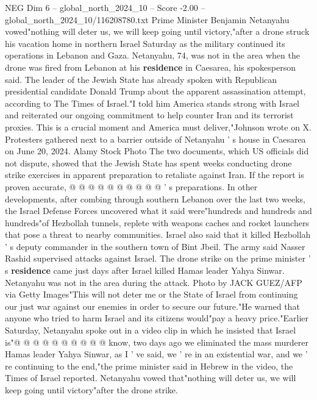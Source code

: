 \begin{textsample}{NEG Dim 6 – global\_north\_2024\_10 – Score -2.00 – global\_north\_2024\_10/116208780.txt}  \label{ex:f6_neg_077}
Prime Minister Benjamin Netanyahu vowed"nothing will deter us, we will keep going until victory,"after a drone struck his vacation home in northern Israel Saturday as the military continued its operations in Lebanon and Gaza.
Netanyahu, 74, was not in the area when the drone was fired from Lebanon at his \textbf{residence} in Caesarea, his spokesperson said.
The leader of the Jewish State has already spoken with Republican presidential candidate Donald Trump about the apparent assassination attempt, according to The Times of Israel."I told him America stands strong with Israel and reiterated our ongoing commitment to help counter Iran and its terrorist proxies.
This is a crucial moment and America must deliver,"Johnson wrote on X.
Protesters gathered next to a barrier outside of Netanyahu ' s house in Caesarea on June 20, 2024.
Alamy Stock Photo The two documents, which US officials did not dispute, showed that the Jewish State has spent weeks conducting drone strike exercises in apparent preparation to retaliate against Iran.
If the report is proven accurate, @ @ @ @ @ @ @ @ @ @ ' s preparations.
In other developments, after combing through southern Lebanon over the last two weeks, the Israel Defense Forces uncovered what it said were"hundreds and hundreds and hundreds"of Hezbollah tunnels, replete with weapons caches and rocket launchers that pose a threat to nearby communities.
Israel also said that it killed Hezbollah ' s deputy commander in the southern town of Bint Jbeil.
The army said Nasser Rashid supervised attacks against Israel.
The drone strike on the prime minister ' s \textbf{residence} came just days after Israel killed Hamas leader Yahya Sinwar.
Netanyahu was not in the area during the attack.
Photo by JACK GUEZ/AFP via Getty Images"This will not deter me or the State of Israel from continuing our just war against our enemies in order to secure our future."He warned that anyone who tried to harm Israel and its citizens would"pay a heavy price."Earlier Saturday, Netanyahu spoke out in a video clip in which he insisted that Israel is"@ @ @ @ @ @ @ @ @ @ know, two days ago we eliminated the mass murderer Hamas leader Yahya Sinwar, as I ' ve said, we ' re in an existential war, and we ' re continuing to the end,"the prime minister said in Hebrew in the video, the Times of Israel reported.
Netanyahu vowed that"nothing will deter us, we will keep going until victory"after the drone strike.

\end{textsample}
